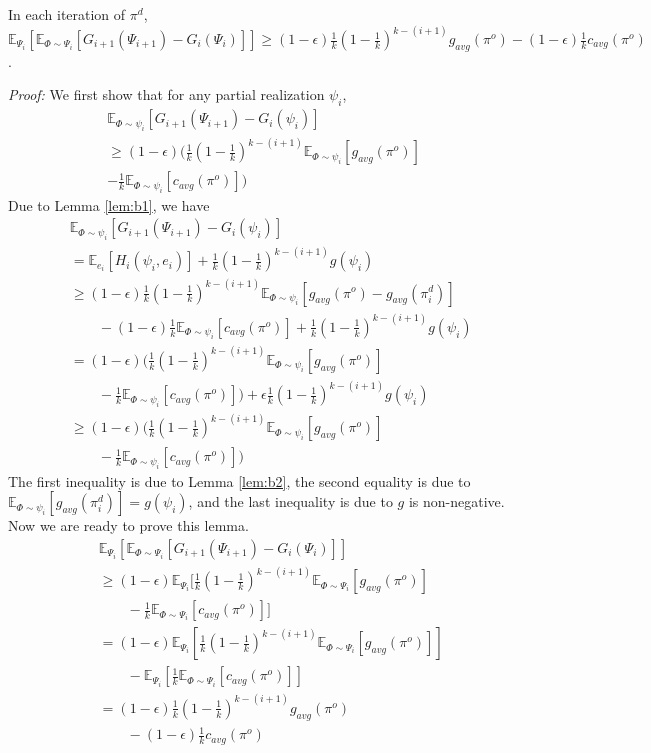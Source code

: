 \documentclass[twoside,leqno,twocolumn]{article}
\begin{document}
\begin{lemma}
\label{lem:b3}
In each iteration of $\pi^d$,
$
\mathbb{E}_{\Psi_i}[\mathbb{E}_{\Phi\sim \Psi_i}[G_{i+1}(\Psi_{i+1})- G_{i}(\Psi_i)]]\geq (1-\epsilon)\frac{1}{k}(1-\frac{1}{k})^{k-(i+1)}g_{avg}(\pi^o) -(1-\epsilon)\frac{1}{k}c_{avg}(\pi^o)$.
\end{lemma}
\emph{Proof:} We first show that for any partial realization $\psi_i$,
\begin{eqnarray}
&\mathbb{E}_{\Phi\sim \psi_i}[G_{i+1}(\Psi_{i+1})- G_{i}(\psi_i)] \label{eq:b1}\\
&\geq (1-\epsilon)(\frac{1}{k}(1-\frac{1}{k})^{k-(i+1)} \mathbb{E}_{\Phi\sim \psi_i}[g_{avg}(\pi^o)]~\nonumber\\
&-\frac{1}{k}\mathbb{E}_{\Phi\sim \psi_i}[c_{avg}(\pi^o)])~\nonumber
\end{eqnarray}
 Due to Lemma \ref{lem:b1}, we have
\begin{eqnarray*}
&&\mathbb{E}_{\Phi\sim \psi_i}[G_{i+1}(\Psi_{i+1})- G_{i}(\psi_i)] \\
&& = \mathbb{E}_{e_i}[H_i(\psi_i, e_i)]+\frac{1}{k}(1-\frac{1}{k})^{k-(i+1)} g(\psi_i)\\
&& \geq (1-\epsilon)\frac{1}{k}(1-\frac{1}{k})^{k-(i+1)}\mathbb{E}_{\Phi\sim \psi_i}[g_{avg}(\pi^o)-g_{avg}(\pi^d_i)]\\
&&\quad\quad -(1-\epsilon)\frac{1}{k}\mathbb{E}_{\Phi\sim \psi_i}[c_{avg}(\pi^o)]+\frac{1}{k}(1-\frac{1}{k})^{k-(i+1)} g(\psi_i)\\
&& = (1-\epsilon)(\frac{1}{k}(1-\frac{1}{k})^{k-(i+1)} \mathbb{E}_{\Phi\sim \psi_i}[g_{avg}(\pi^o)]\\
&&\quad\quad-\frac{1}{k}\mathbb{E}_{\Phi\sim \psi_i}[c_{avg}(\pi^o)] ) +\epsilon\frac{1}{k}(1-\frac{1}{k})^{k-(i+1)} g(\psi_i)\\
&& \geq (1-\epsilon)(\frac{1}{k}(1-\frac{1}{k})^{k-(i+1)} \mathbb{E}_{\Phi\sim \psi_i}[g_{avg}(\pi^o)]\\
&&\quad\quad -\frac{1}{k}\mathbb{E}_{\Phi\sim \psi_i}[c_{avg}(\pi^o)])
\end{eqnarray*}
The first inequality is due to Lemma \ref{lem:b2}, the second equality is due to $\mathbb{E}_{\Phi\sim \psi_i}[g_{avg}(\pi^d_i)] =  g(\psi_i)$, and the last inequality is due to $g$ is non-negative. Now we are ready to prove this lemma.
\begin{eqnarray*}
&&\mathbb{E}_{\Psi_i}[\mathbb{E}_{\Phi\sim \Psi_i}[G_{i+1}(\Psi_{i+1})- G_{i}(\Psi_i)]] \\
&& \geq (1-\epsilon)\mathbb{E}_{\Psi_i}[\frac{1}{k}(1-\frac{1}{k})^{k-(i+1)} \mathbb{E}_{\Phi\sim \Psi_i}[g_{avg}(\pi^o)]\\
&&\quad\quad-\frac{1}{k}\mathbb{E}_{\Phi\sim \Psi_i}[c_{avg}(\pi^o)]]\\
&& = (1-\epsilon)\mathbb{E}_{\Psi_i}[\frac{1}{k}(1-\frac{1}{k})^{k-(i+1)} \mathbb{E}_{\Phi\sim \Psi_i}[g_{avg}(\pi^o)]] \\
&&\quad\quad-  \mathbb{E}_{\Psi_i}[\frac{1}{k}\mathbb{E}_{\Phi\sim \Psi_i}[c_{avg}(\pi^o)]]\\
&& = (1-\epsilon)\frac{1}{k}(1-\frac{1}{k})^{k-(i+1)}g_{avg}(\pi^o) \\
&&\quad\quad-(1-\epsilon)\frac{1}{k}c_{avg}(\pi^o)
\end{eqnarray*}
\end{document}
